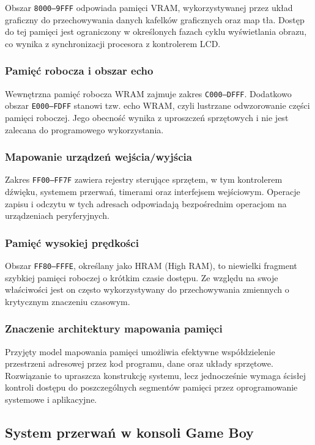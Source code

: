 \documentclass{article}
\begin{document}
Obszar \texttt{8000--9FFF} odpowiada pamięci VRAM, wykorzystywanej przez układ graficzny do przechowywania danych kafelków graficznych oraz map tła. Dostęp do tej pamięci jest ograniczony w określonych fazach cyklu wyświetlania obrazu, co wynika z synchronizacji procesora z kontrolerem LCD.

\subsubsection{Pamięć robocza i obszar echo}

Wewnętrzna pamięć robocza WRAM zajmuje zakres \texttt{C000--DFFF}. Dodatkowo obszar \texttt{E000--FDFF} stanowi tzw. echo WRAM, czyli lustrzane odwzorowanie części pamięci roboczej. Jego obecność wynika z uproszczeń sprzętowych i nie jest zalecana do programowego wykorzystania.

\subsubsection{Mapowanie urządzeń wejścia/wyjścia}

Zakres \texttt{FF00--FF7F} zawiera rejestry sterujące sprzętem, w tym kontrolerem dźwięku, systemem przerwań, timerami oraz interfejsem wejściowym. Operacje zapisu i odczytu w tych adresach odpowiadają bezpośrednim operacjom na urządzeniach peryferyjnych.

\subsubsection{Pamięć wysokiej prędkości}

Obszar \texttt{FF80--FFFE}, określany jako HRAM (High RAM), to niewielki fragment szybkiej pamięci roboczej o krótkim czasie dostępu. Ze względu na swoje właściwości jest on często wykorzystywany do przechowywania zmiennych o krytycznym znaczeniu czasowym.

\subsubsection{Znaczenie architektury mapowania pamięci}

Przyjęty model mapowania pamięci umożliwia efektywne współdzielenie przestrzeni adresowej przez kod programu, dane oraz układy sprzętowe. Rozwiązanie to upraszcza konstrukcję systemu, lecz jednocześnie wymaga ścisłej kontroli dostępu do poszczególnych segmentów pamięci przez oprogramowanie systemowe i aplikacyjne.
\subsection{System przerwań w konsoli Game Boy}
\end{document}
